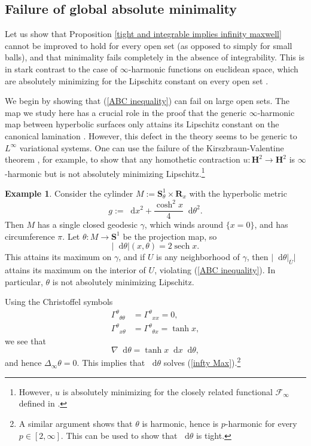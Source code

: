 \documentclass[reqno,11pt]{amsart}
\newcommand{\RR}{\mathbf{R}}
\newcommand{\Hyp}{\mathbf H}
\newcommand{\Sph}{\mathbf S}
\newcommand*\dif{\mathop{}\!\mathrm{d}}
\DeclareMathOperator{\sech}{sech}
\theoremstyle{definition}
\newtheorem{example}[theorem]{Example}
\numberwithin{equation}{section}
\begin{document}
\subsection{Failure of global absolute minimality}\label{nonintegrability}
Let us show that Proposition \ref{tight and integrable implies infinity maxwell} cannot be improved to hold for every open set (as opposed to simply for small balls), and that minimality fails completely in the absence of integrability.
This is in stark contrast to the case of $\infty$-harmonic functions on euclidean space, which are absolutely minimizing for the Lipschitz constant on every open set \cite{Crandall2008}.

We begin by showing that (\ref{ABC inequality}) can fail on large open sets.
The map we study here has a crucial role in the proof that the generic $\infty$-harmonic map between hyperbolic surfaces only attains its Lipschitz constant on the canonical lamination \cite{daskalopoulos2022}.
However, this defect in the theory seems to be generic to $L^\infty$ variational systems.
One can use the failure of the Kirszbraun-Valentine theorem \cite[Example 9.6]{Gu_ritaud_2017}, for example, to show that any homothetic contraction $u: \Hyp^2 \to \Hyp^2$ is $\infty$-harmonic but is not absolutely minimizing Lipschitz.\footnote{However, $u$ is absolutely minimizing for the closely related functional $\mathcal F_\infty$ defined in \cite{Crandall2008}.}

\begin{example}
Consider the cylinder $M := \Sph^1_\theta \times \RR_x$ with the hyperbolic metric
$$g := \dif x^2 + \frac{\cosh^2 x}{4} \dif \theta^2.$$
Then $M$ has a single closed geodesic $\gamma$, which winds around $\{x = 0\}$, and has circumference $\pi$.
Let $\theta: M \to \Sph^1$ be the projection map, so
$$|\dif \theta|(x, \theta) = 2 \sech x.$$
This attains its maximum on $\gamma$, and if $U$ is any neighborhood of $\gamma$, then $|\dif \theta|_{\overline U}|$ attains its maximum on the interior of $U$, violating (\ref{ABC inequality}).
In particular, $\theta$ is not absolutely minimizing Lipschitz.

Using the Christoffel symbols
\begin{align*}
{\Gamma^\theta}_{\theta \theta} &= {\Gamma^\theta}_{x x} = 0, \\
{\Gamma^\theta}_{x \theta} &= {\Gamma^\theta}_{\theta x} = \tanh x,
\end{align*}
we see that
$$\nabla \dif \theta = \tanh x \dif x \dif \theta,$$
and hence $\Delta_\infty \theta = 0$.
This implies that $\dif \theta$ solves (\ref{infty Max}).\footnote{A similar argument shows that $\theta$ is harmonic, hence is $p$-harmonic for every $p \in [2, \infty]$. This can be used to show that $\dif \theta$ is tight.}
\end{example}
\end{document}
